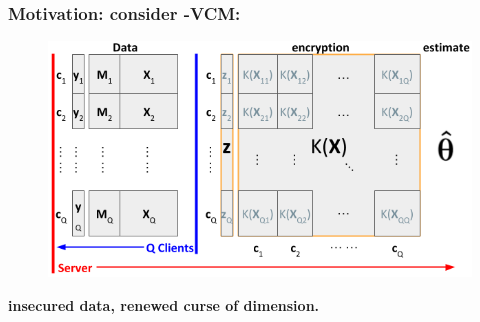 \documentclass{beamer}
\begin{document}
\begin{frame}\frametitle{Motivation: \textbf{consider
      -VCM:}} %
  \begin{figure}\includegraphics[width=.90\textwidth]{img/mega0}\end{figure}
  \textbf{ insecured data, renewed curse of
    dimension.}
\end{frame}
\end{document}
